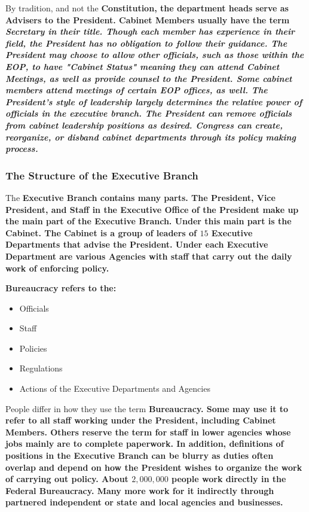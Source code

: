 By tradition, and not the \bf{Constitution}, the department heads serve as
\bf{Advisers} to the \bf{President}. \bf{Cabinet Members} usually have the term
\it{Secretary} in their title. Though each member has experience in their field,
the \bf{President} has no obligation to follow their guidance. The
\bf{President} may choose to allow other officials, such as those within the
EOP, to have \it{"Cabinet Status"} meaning they can attend \bf{Cabinet
Meetings}, as well as provide counsel to the \bf{President}. Some cabinet
members attend meetings of certain EOP offices, as well. The \bf{President's}
style of leadership largely determines the relative power of officials in the
executive branch. The \bf{President} can remove officials from cabinet
leadership positions as desired. \bf{Congress} can create, reorganize, or
disband cabinet departments through its policy making process.

\subsubsection*{The Structure of the Executive Branch}

The \bf{Executive Branch} contains many parts. The \bf{President}, \bf{Vice
President}, and \bf{Staff in the Executive Office of the President} make up the
main part of the \bf{Executive Branch}. Under this main part is the
\bf{Cabinet}. The \bf{Cabinet} is a group of leaders of $15$ \bf{Executive
Departments} that advise the \bf{President}. Under each \bf{Executive
Department} are various \bf{Agencies} with staff that carry out the daily work
of enforcing policy.

\bf{Bureaucracy} refers to the:

\begin{itemize}
    \item Officials
    \item Staff
    \item Policies
    \item Regulations
    \item Actions of the Executive Departments and Agencies
\end{itemize}

People differ in how they use the term \bf{Bureaucracy}. Some may use it to
refer to all staff working under the \bf{President}, including \bf{Cabinet
Members}. Others reserve the term for staff in lower agencies whose jobs mainly
are to complete paperwork. In addition, definitions of positions in the
\bf{Executive Branch} can be blurry as duties often overlap and depend on how
the \bf{President} wishes to organize the work of carrying out policy. About
$2,000,000$ people work directly in the \bf{Federal Bureaucracy}. Many more work
for it indirectly through partnered independent or state and local agencies and
businesses.

